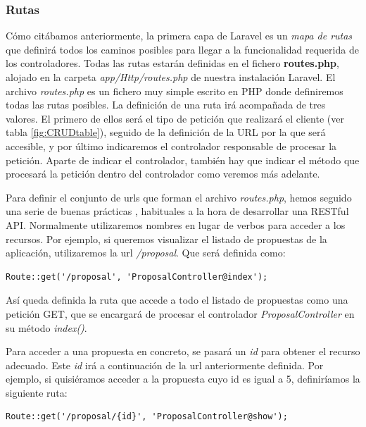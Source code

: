 \subsubsection{Rutas}

Cómo citábamos anteriormente, la primera capa de Laravel es un \textit{mapa de rutas} que definirá todos los caminos posibles para llegar a la funcionalidad requerida de los controladores. Todas las rutas estarán definidas en el fichero \textbf{routes.php}, alojado en la carpeta \textit{app/Http/routes.php} de nuestra instalación Laravel. El archivo \textit{routes.php} es un fichero muy simple escrito en PHP donde definiremos todas las rutas posibles. La definición de una ruta irá acompañada de tres valores. El primero de ellos será el tipo de petición que realizará el cliente (ver tabla \ref{fig:CRUDtable}), seguido de la definición de la URL por la que será accesible, y por último indicaremos el controlador responsable de procesar la petición. Aparte de indicar el controlador, también hay que indicar el método que procesará la petición dentro del controlador como veremos más adelante.

Para definir el conjunto de urls que forman el archivo \textit{routes.php}, hemos seguido una serie de buenas prácticas \cite{ref:practicesRESTful_API}, habituales a la hora de desarrollar una RESTful API. Normalmente utilizaremos nombres en lugar de verbos para acceder a los recursos. Por ejemplo, si queremos visualizar el listado de propuestas de la aplicación, utilizaremos la url \textit{/proposal}. Que será definida como:	

\lstset{
   language        = php}
\begin{lstlisting}[frame=single]	
Route::get('/proposal', 'ProposalController@index');
\end{lstlisting}

Así queda definida la ruta que accede a todo el listado de propuestas como una petición GET, que se encargará de procesar el controlador \textit{ProposalController} en su método \textit{index()}.

Para acceder a una propuesta en concreto, se pasará un \textit{id} para obtener el recurso adecuado. Este \textit{id} irá a continuación de la url anteriormente definida. Por ejemplo, si quisiéramos acceder a la propuesta cuyo id es igual a 5, definiríamos la siguiente ruta:

\lstset{
  language        = php}
  \begin{lstlisting}[frame=single]	
Route::get('/proposal/{id}', 'ProposalController@show');
\end{lstlisting}

